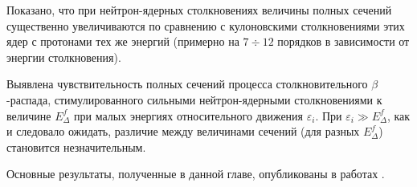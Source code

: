 Показано, что при нейтрон-ядерных столкновениях величины полных сечений
существенно увеличиваются по сравнению с кулоновскими столкновениями
этих ядер с протонами тех же энергий (примерно на $7 \div 12$ порядков
в зависимости от энергии столкновения).


Выявлена чувствительность полных сечений процесса столкновительного
$\beta$-распада, стимулированного сильными нейтрон-ядерными столкновениями
к величине $E_\Delta^f$
при малых энергиях относительного движения $\varepsilon_i$.
При $\varepsilon_i \gg E_\Delta^f$, как и следовало ожидать, различие между
величинами сечений (для разных $E_\Delta^f$) становится незначительным.


Основные результаты, полученные в данной главе, опубликованы в работах
\cite{K8, K10, K11}.

